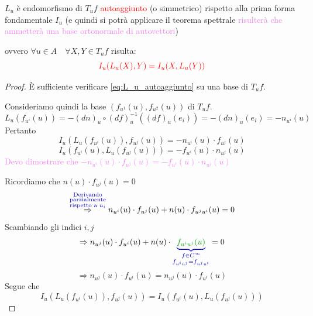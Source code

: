         \newpage
        \begin{teorema}
        $L_u$ è endomorfismo di $T_u f$ \textcolor{red}{autoaggiunto} \textcolor{blu}{(o simmetrico)} rispetto alla prima forma fondamentale $I_u$
        \textcolor{blu}{(e quindi si potrà applicare il teorema spettrale \textcolor{violet}{risulterà che ammetterà una base ortonormale di autovettori})} 
        
        ovvero $\forall u \in A \quad \forall X,Y \in T_u f$ risulta:
        \begin{equation}
        \label{eq:L_u_autoaggiunto}
        \color{red} I_u (L_u(X), Y) = I_u (X, L_u(Y))
        \end{equation}
        \end{teorema}
        \begin{proof}
        \mbox{}

        È sufficiente verificare \eqref{eq:L_u_autoaggiunto} su una base di $T_u f$. 

        Consideriamo quindi la base $\left(f_{u^1} (u), f_{u^2} (u)\right)$ di $T_u f$.
        \[ L_u \left(f_{u^i} (u)\right) = - (d n)_u \circ (df)^{-1}_u \left((df)_u (e_i)\right) = - (d n)_u (e_i) = -n_{u^i}(u) \]
        Pertanto 
        \[ I_u \left( L_u(f_{u^i}(u)), f_{u^j}(u) \right) = - n_{u^i}(u) \cdot f_{u^j} (u) \]
        \[ I_u \left( f_{u^i}(u), L_u(f_{u^j}(u)) \right) = - f_{u^i}(u) \cdot n_{u^j} (u) \]
        \textcolor{violet}{Devo dimostrare che $- n_{u^i}(u) \cdot f_{u^j} (u) = - f_{u^i}(u) \cdot n_{u^j} (u)$}

        Ricordiamo che $n(u) \cdot f_{u^j}(u) = 0$ 
        \begin{equation} 
        \label{eq:L_u_autoaggiundo_dim_1}
        \overset{\textcolor{blu}{\substack{\text{Derivando} \\ \text{parzialmente} \\ \text{rispetto a } u_i}}}{\Rightarrow} n_{u^i}(u) \cdot f_{u^j}(u) + n(u) \cdot f_{u^j u^i}(u) = 0 
        \end{equation}
        Scambiando gli indici $i,j$
        \[ \Rightarrow n_{u^j}(u) \cdot f_{u^i}(u) + n(u) \cdot 
        \textcolor{blu}{\underbrace{\textcolor{verde}{f_{u^i u^j}(u)}}_{\substack{f \in C^\infty \\ f_{u^i u^j} = f_{u^j u^i}}}}=0 \]
        \[ \Rightarrow n_{u^j}(u) \cdot f_{u^i}(u) = n_{u^j}(u) \cdot f_{u^i}(u) \]
        Segue che 
        \[ I_u \left( L_u(f_{u^i}(u)), f_{u^j}(u) \right) = I_u \left( f_{u^i}(u), L_u(f_{u^j}(u)) \right) \]
        \end{proof}
